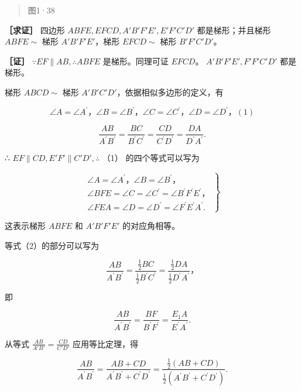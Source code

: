 \begin{quote}
图1·38
\end{quote}

\textbf{［求证］} 四边形 \(ABFE, EFCD, A'B'F'E', E'F'C'D'\)
都是梯形；并且梯形 \(ABFE \sim\) 梯形 \(A'B'F'E'\)，梯形 \(EFCD \sim\)
梯形 \(B'F'C'D'\)。

\textbf{［证］} \(\because EF \parallel AB, \therefore ABFE\)
是梯形。同理可证 \(EFCD\)。 \(A'B'F'E', F'F'C'D'\) 都是梯形。

梯形 \(ABCD\sim\) 梯形 \(A'B'C'D'\)，依据相似多边形的定义，有

\[
\angle A = \angle A ^ {\prime}\text{，} \angle B = \angle B ^ {\prime}\text{，} \angle C = \angle C ^ {\prime}\text{，} \angle D = \angle D ^ {\prime}\text{，} (1)
\]

\[
\frac {A B}{A ^ {\prime} B ^ {\prime}} = \frac {B C}{B ^ {\prime} C ^ {\prime}} = \frac {C D}{C ^ {\prime} D ^ {\prime}} = \frac {D A}{D ^ {\prime} A ^ {\prime}}. \tag {2}
\]

∴ \(EF \parallel CD, E'F' \parallel C'D', \therefore\) （1）
的四个等式可以写为

\[
\left. \begin{array}{l} \angle A = \angle A ^ {\prime}\text{，} \angle B = \angle B ^ {\prime}\text{，} \\ \angle B F E = \angle C = \angle C ^ {\prime} = \angle B ^ {\prime} F ^ {\prime} E ^ {\prime}\text{，} \\ \angle F E A = \angle D = \angle D ^ {\prime} = \angle F ^ {\prime} E ^ {\prime} A ^ {\prime}. \end{array} \right\} \tag {3}
\]

这表示梯形 \(ABFE\) 和 \(A'B'F'E'\) 的对应角相等。

等式（2）的部分可以写为

\[
\frac {A B}{A ^ {\prime} B ^ {\prime}} = \frac {\frac {1}{2} B C}{\frac {1}{2} B ^ {\prime} C ^ {\prime}} = \frac {\frac {1}{2} D A}{\frac {1}{2} D ^ {\prime} A ^ {\prime}}\text{，}
\]

即

\[
\frac {A B}{A ^ {\prime} B ^ {\prime}} = \frac {B F}{B ^ {\prime} F ^ {\prime}} = \frac {E _ {1} A}{E ^ {\prime} A ^ {\prime}}. \tag {4}
\]

从等式 \(\frac{AB}{A'B'} = \frac{CD}{C'D'}\) 应用等比定理，得

\[
\frac {A B}{A ^ {\prime} B ^ {\prime}} = \frac {A B + C D}{A ^ {\prime} B ^ {\prime} + C ^ {\prime} D ^ {\prime}} = \frac {\frac {1}{2} (A B + C D)}{\frac {1}{2} (A ^ {\prime} B ^ {\prime} + C ^ {\prime} D ^ {\prime})}. \tag {5}
\]

